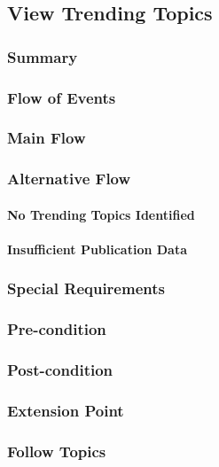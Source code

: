 \subsection{View Trending Topics}
\subsubsection{Summary}

\subsubsection{Flow of Events}
\subsubsection*{Main Flow}

\subsubsection*{Alternative Flow}
\paragraph{No Trending Topics Identified}

\paragraph{Insufficient Publication Data}

\subsubsection{Special Requirements}

\subsubsection{Pre-condition}

\subsubsection{Post-condition}

\subsubsection{Extension Point}
\subsubsection*{Follow Topics}

